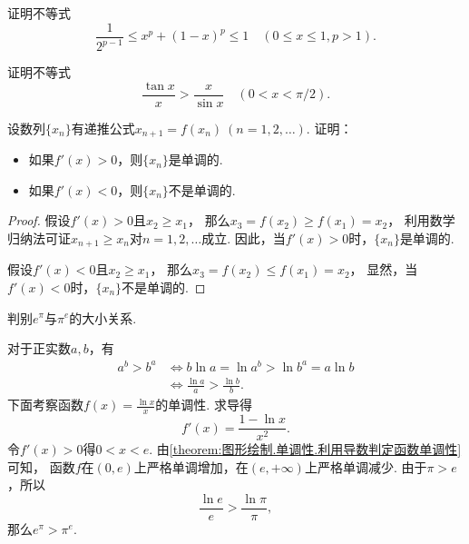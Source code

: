 \begin{example}
证明不等式\begin{equation*}
	\frac1{2^{p-1}}
	\leq x^p + (1-x)^p
	\leq 1
	\quad(0 \leq x \leq 1, p>1).
\end{equation*}
\end{example}
\begin{example}
证明不等式\begin{equation*}
	\frac{\tan x}{x} > \frac{x}{\sin x}
	\quad(0 < x < \pi/2).
\end{equation*}
\end{example}

\begin{example}
设数列\(\{x_n\}\)有递推公式\(x_{n+1} = f(x_n)\ (n=1,2,\dotsc)\).
证明：\begin{itemize}
	\item 如果\(f'(x) > 0\)，则\(\{x_n\}\)是单调的.
	\item 如果\(f'(x) < 0\)，则\(\{x_n\}\)不是单调的.
\end{itemize}
\begin{proof}
假设\(f'(x) > 0\)且\(x_2 \geq x_1\)，
那么\(x_3 = f(x_2) \geq f(x_1) = x_2\)，
利用数学归纳法可证\(x_{n+1} \geq x_n\)对\(n=1,2,\dotsc\)成立.
因此，当\(f'(x) > 0\)时，\(\{x_n\}\)是单调的.

假设\(f'(x) < 0\)且\(x_2 \geq x_1\)，
那么\(x_3 = f(x_2) \leq f(x_1) = x_2\)，
显然，当\(f'(x) < 0\)时，\(\{x_n\}\)不是单调的.
\end{proof}
\end{example}

\begin{example}
判别\(e^\pi\)与\(\pi^e\)的大小关系.
\begin{solution}
对于正实数\(a,b\)，有\begin{align*}
	a^b > b^a
	&\iff
	b \ln a = \ln a^b > \ln b^a = a \ln b \\
	&\iff
	\frac{\ln a}{a} > \frac{\ln b}{b}.
\end{align*}
下面考察函数\(f(x) = \frac{\ln x}{x}\)的单调性.
求导得\begin{equation*}
	f'(x) = \frac{1 - \ln x}{x^2}.
\end{equation*}
令\(f'(x) > 0\)得\(0 < x < e\).
由\cref{theorem:图形绘制.单调性.利用导数判定函数单调性} 可知，
函数\(f\)在\((0,e)\)上严格单调增加，在\((e,+\infty)\)上严格单调减少.
由于\(\pi > e\)，所以\begin{equation*}
	\frac{\ln e}{e} > \frac{\ln \pi}{\pi},
\end{equation*}
那么\(e^\pi > \pi^e\).
\end{solution}
\end{example}


